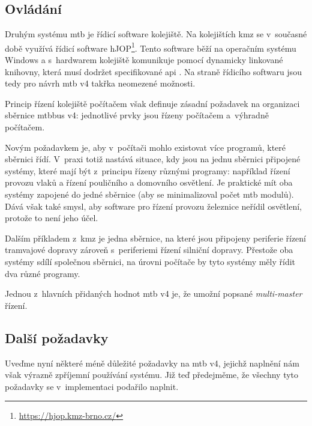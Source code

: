 \subsection{Ovládání}

Druhým  systému \gls{mtb} je řídicí software kolejiště. Na
kolejištích \gls{kmz} se v~současné době využívá řídicí software
hJOP\footnote{\url{https://hjop.kmz-brno.cz/}}. Tento software běží na
operačním systému Windows a s~hardwarem kolejiště komunikuje pomocí dynamicky
linkované knihovny, která musí dodržet specifikované \gls{api} \cite{hjop:rcs:web}.
Na straně řídicího softwaru jsou tedy pro návrh \gls{mtb} v4 takřka neomezené
možnosti.

Princip řízení kolejiště počítačem však definuje zásadní požadavek na
organizaci sběrnice \gls{mtbbus} v4: jednotlivé prvky jsou řízeny počítačem
a~výhradně počítačem.

Novým požadavkem je, aby v~počítači mohlo existovat více programů, které
sběrnici řídí. V~praxi totiž nastává situace, kdy jsou na jednu sběrnici
připojené systémy, které mají být z~principu řízeny různými programy: například
řízení provozu vlaků a řízení pouličního a domovního osvětlení.  Je praktické mít
oba systémy zapojené do jedné sběrnice (aby se minimalizoval počet \gls{mtb}
modulů). Dává však také smysl, aby software pro řízení provozu železnice neřídil
osvětlení, protože to není jeho účel.

Dalším příkladem z~\gls{kmz} je jedna sběrnice, na které jsou připojeny
periferie řízení tramvajové dopravy zároveň s~periferiemi řízení silniční
dopravy. Přestože oba systémy sdílí společnou sběrnici, na úrovni počítače by
tyto systémy měly řídit dva různé programy.

Jednou z~hlavních přidaných hodnot \gls{mtb} v4 je, že umožní popsané
\textit{multi-master} řízení.

\subsection{Další požadavky}

Uveďme nyní některé méně důležité požadavky na \gls{mtb} v4, jejichž naplnění
nám však výrazně zpříjemní používání systému. Již teď předejměme, že všechny tyto
požadavky se v~implementaci podařilo naplnit.


